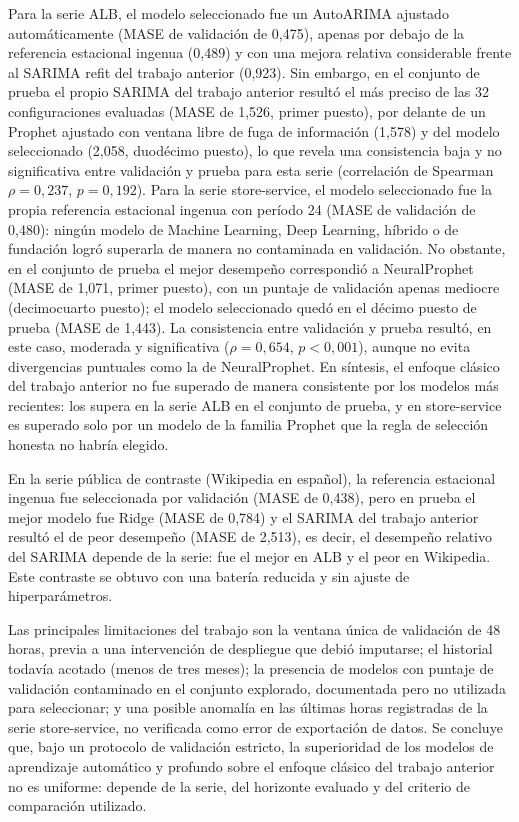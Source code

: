 Para la serie ALB, el modelo seleccionado fue un AutoARIMA ajustado automáticamente (MASE de validación
de 0,475), apenas por debajo de la referencia estacional ingenua (0,489) y con una mejora relativa
considerable frente al SARIMA refit del trabajo anterior (0,923). Sin embargo, en el conjunto de prueba
el propio SARIMA del trabajo anterior resultó el más preciso de las 32 configuraciones evaluadas (MASE de
1,526, primer puesto), por delante de un Prophet ajustado con ventana libre de fuga de información (1,578) y del modelo
seleccionado (2,058, duodécimo puesto), lo que revela una consistencia baja y no significativa entre
validación y prueba para esta serie (correlación de Spearman $\rho=0,237$, $p=0,192$). Para la serie
store-service, el modelo seleccionado fue la propia referencia estacional ingenua con período 24 (MASE de
validación de 0,480): ningún modelo de Machine Learning, Deep Learning, híbrido o de fundación logró
superarla de manera no contaminada en validación. No obstante, en el conjunto de prueba el mejor
desempeño correspondió a NeuralProphet (MASE de 1,071, primer puesto), con un puntaje de validación
apenas mediocre (decimocuarto puesto); el modelo seleccionado quedó en el décimo puesto de prueba (MASE
de 1,443). La consistencia entre validación y prueba resultó, en este caso, moderada y significativa
($\rho=0,654$, $p<0,001$), aunque no evita divergencias puntuales como la de NeuralProphet. En síntesis,
el enfoque clásico del trabajo anterior no fue superado de manera consistente por los modelos más
recientes: los supera en la serie ALB en el conjunto de prueba, y en store-service es superado solo por
un modelo de la familia Prophet que la regla de selección honesta no habría elegido.

En la serie pública de contraste (Wikipedia en español), la referencia estacional ingenua fue
seleccionada por validación (MASE de 0,438), pero en prueba el mejor modelo fue Ridge (MASE de
0,784) y el SARIMA del trabajo anterior resultó el de peor desempeño (MASE de
2,513), es decir, el desempeño relativo del SARIMA depende de la serie: fue el mejor en ALB y
el peor en Wikipedia. Este contraste se obtuvo con una batería reducida y sin ajuste de hiperparámetros.

Las principales limitaciones del trabajo son la ventana única de validación de 48 horas, previa a una
intervención de despliegue que debió imputarse; el historial todavía acotado (menos de tres meses); la
presencia de modelos con puntaje de validación contaminado en el conjunto explorado, documentada pero no
utilizada para seleccionar; y una posible anomalía en las últimas horas registradas de la serie store-service, no
verificada como error de exportación de datos. Se concluye que, bajo un protocolo de validación estricto,
la superioridad de los modelos de aprendizaje automático y profundo sobre el enfoque clásico del trabajo
anterior no es uniforme: depende de la serie, del horizonte evaluado y del criterio de comparación
utilizado.
